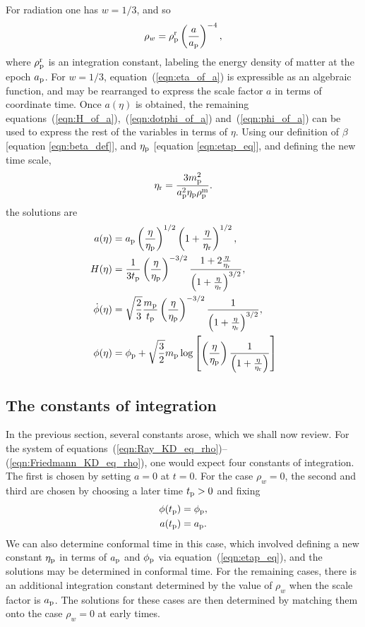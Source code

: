 For radiation one has $w=1/3$, and so
%
\begin{equation}
  \rho_w = \rho_{\mathrm{p}}^{\mathrm{r}}\left(\frac{a}{a_{\mathrm{p}}}\right)^{-4},
\end{equation}
%
where $\rho_{\mathrm{p}}^{\mathrm{r}}$ is an integration constant, labeling the energy density of matter at the epoch $a_{\mathrm{p}}$.  For $w=1/3$, equation~(\ref{eqn:eta_of_a}) is expressible as an algebraic function, and may be rearranged to express the scale factor $a$ in terms of coordinate time. Once $a(\eta)$ is obtained, the remaining equations~(\ref{eqn:H_of_a}),~(\ref{eqn:dotphi_of_a}) and~(\ref{eqn:phi_of_a}) can be used to express the rest of the variables in terms of $\eta$. Using our definition of $\beta$ [equation \ref{eqn:beta_def}], and $\eta_{\mathrm{p}}$ [equation \ref{eqn:etap_eq}], and defining the new time scale,
%
\begin{equation}
  \eta_{\mathrm{r}} = \frac{3m_{\mathrm{p}}^2}{a_{\mathrm{p}}^2\eta_{\mathrm{p}}\rho_{\mathrm{p}}^{\mathrm{m}}}.
  \label{eqn:etar}
\end{equation}
%
the solutions are
%
\begin{align}
  a(\eta)
  &=
  a_{\mathrm{p}}\left(\frac{\eta}{\eta_{\mathrm{p}}}\right)^{1/2}
  \left({1+\frac{\eta}{\eta_{\mathrm{r}}}}\right)^{1/2},
  \\
  H(\eta) 
  &= 
  \frac{1}{3t_{\mathrm{p}}}\left(\frac{\eta}{\eta_{\mathrm{p}}}\right)^{-3/2}
  \frac{1+ 2\frac{\eta}{\eta_{\mathrm{r}}}}
  {\left(1+ \frac{\eta}{\eta_{\mathrm{r}}}\right)^{3/2}},
  \\
  \dot{\phi}(\eta) 
  &=
  \sqrt{\frac{2}{3}}\frac{m_{\mathrm{p}}}{t_{\mathrm{p}}}
  \left(\frac{\eta}{\eta_{\mathrm{p}}}\right)^{-3/2}
  \frac{1}{\left(1+ \frac{\eta}{\eta_{\mathrm{r}}}\right)^{3/2}},
  \\ 
  \phi(\eta) 
  &=
  \phi_{\mathrm{p}}+\sqrt {\frac{3}{2}}m_{\mathrm{p}}\log  
  \left[
  \left(\frac{\eta}{\eta_{\mathrm{p}}}\right)
  \frac {1}{\left(1+ \frac{\eta}{\eta_{\mathrm{r}}}\right)} 
  \right] 
\end{align}
%

\subsection{The constants of integration}
\label{sec:constants}
In the previous section, several constants arose, which we shall now review. For the system of equations~(\ref{eqn:Ray_KD_eq_rho})--(\ref{eqn:Friedmann_KD_eq_rho}), one would expect four constants of integration. The first is chosen by setting $a=0$ at $t=0$. For the case $\rho_w=0$, the second and third are chosen by choosing a later time $t_{\mathrm{p}}>0$ and fixing
%
\begin{align}
  \phi(t_{\mathrm{p}}) &= \phi_{\mathrm{p}}, \nonumber\\
  a(t_{\mathrm{p}}) &= a_{\mathrm{p}}. \nonumber
\end{align}
%
We can also determine conformal time in this case, which involved defining a new constant $\eta_{\mathrm{p}}$ in terms of $a_{\mathrm{p}}$ and $\phi_{\mathrm{p}}$ via equation~(\ref{eqn:etap_eq}), and the solutions may be determined in conformal time. For the remaining cases, there is an additional integration constant determined by the value of $\rho_w$ when the scale factor is $a_{\mathrm{p}}$. The solutions for these cases are then determined by matching them onto the case $\rho_w=0$ at early times.

